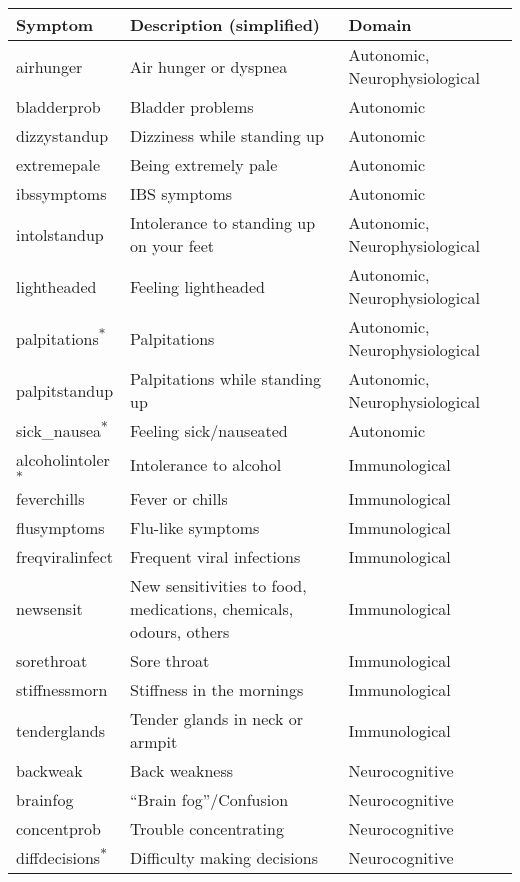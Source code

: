 \begin{tabular}{lll}
\toprule
Symptom & Description (simplified) & Domain \\ 
\midrule
airhunger & Air hunger or dyspnea & Autonomic, Neurophysiological \\
bladderprob & Bladder problems & Autonomic \\
dizzystandup & Dizziness while standing up & Autonomic \\
extremepale & Being extremely pale & Autonomic \\
ibssymptoms & IBS symptoms & Autonomic \\
intolstandup & Intolerance to standing up on your feet & Autonomic, Neurophysiological \\
lightheaded & Feeling lightheaded & Autonomic, Neurophysiological \\
palpitations\textsuperscript{${\ast}$} & Palpitations & Autonomic, Neurophysiological \\
palpitstandup & Palpitations while standing up & Autonomic, Neurophysiological \\
sick\_nausea\textsuperscript{${\ast}$} & Feeling sick/nauseated & Autonomic \\
alcoholintoler\textsuperscript{${\ast}$} & Intolerance to alcohol & Immunological \\
feverchills & Fever or chills & Immunological \\
flusymptoms & Flu-like symptoms & Immunological \\
freqviralinfect & Frequent viral infections & Immunological \\
newsensit & New sensitivities to food, medications, chemicals, odours, others & Immunological \\
sorethroat & Sore throat & Immunological \\
stiffnessmorn & Stiffness in the mornings & Immunological \\
tenderglands & Tender glands in neck or armpit & Immunological \\
backweak & Back weakness & Neurocognitive \\
brainfog & ``Brain fog''/Confusion & Neurocognitive \\
concentprob & Trouble concentrating & Neurocognitive \\
diffdecisions\textsuperscript{${\ast}$} & Difficulty making decisions & Neurocognitive \\

\end{tabular}
